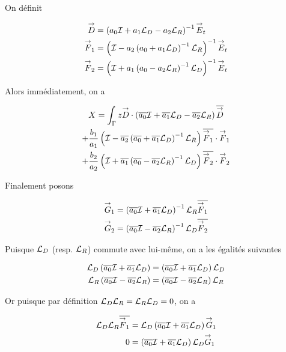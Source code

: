   On définit

  \newcommand{\vD}{\vect{D}}
  \newcommand{\vF}{\vect{F}}

  \begin{align}
    \vD & = \left(a_0 \oI + a_1 \LD - a_2\LR \right)^{-1} \vE_t
    \\
    \vF_1 & = \left(\oI - a_2 \left( a_0 + a_1\LD\right)^{-1}\LR\right)^{-1} \vE_t
    \\
    \vF_2 & = \left(\oI + a_1 \left( a_0 - a_2\LR\right)^{-1}\LD\right)^{-1} \vE_t
  \end{align}

  Alors immédiatement, on a

  \begin{multline}
    X = \int_\Gamma z \vD \cdot \left(\conj{a_0} \oI + \conj{a_1} \LD - \conj{a_2}\LR\right)\conj{\vD}
    \\
    + \frac{b_1}{a_1} \left(\oI - \conj{a_2} \left( \conj{a_0} + \conj{a_1}\LD\right)^{-1}\LR\right)\conj{\vF_1}\cdot\vF_1
    \\
    + \frac{b_2}{a_2} \left(\oI + \conj{a_1} \left( \conj{a_0} - \conj{a_2}\LR\right)^{-1}\LD\right)\conj{\vF_2}\cdot\vF_2
  \end{multline}

  Finalement posons

  \newcommand{\vG}{\vect{G}}

  \begin{align}
    \vG_1 & = \left(\conj{a_0} \oI + \conj{a_1} \LD \right)^{-1}\LR \conj{\vF_1}
    \\
    \vG_2 & = \left(\conj{a_0} \oI - \conj{a_2} \LR \right)^{-1}\LD \conj{\vF_2}
  \end{align}

  Puisque \({\mathcal{L}_D}\) (resp. \({\mathcal{L}_R}\)) commute avec lui-même, on a les égalités suivantes

  \begin{align}
    {\mathcal{L}_D}\left({\overline{a_0}} {\mathcal{I}} + {\overline{a_1}} {\mathcal{L}_D} \right)&=\left({\overline{a_0}} {\mathcal{I}} + {\overline{a_1}} {\mathcal{L}_D} \right){\mathcal{L}_D}
    \\
    {\mathcal{L}_R}\left({\overline{a_0}} {\mathcal{I}} - {\overline{a_2}} {\mathcal{L}_R} \right)&=\left({\overline{a_0}} {\mathcal{I}} - {\overline{a_2}} {\mathcal{L}_R} \right){\mathcal{L}_R}
  \end{align}

  Or puisque par définition \({\mathcal{L}_D}{\mathcal{L}_R}={\mathcal{L}_R}{\mathcal{L}_D}=0\), on a

  \begin{align}
    \LD\LR\conj{\vF_1} &= \LD\left(\conj{a_0} \oI + \conj{a_1} \LD \right)\vG_1
    \\
    0 & =\left(\conj{a_0} \oI + \conj{a_1} \LD \right)\LD\vG_1
  \end{align}


